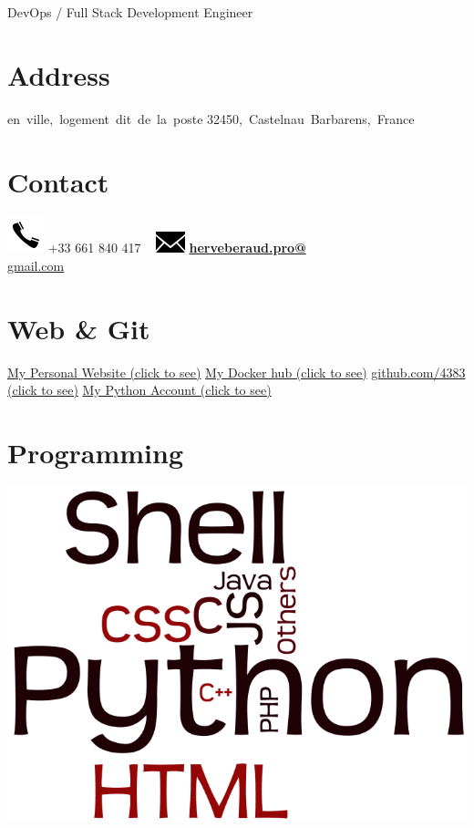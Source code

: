 \documentclass[]{friggeri-cv}
\begin{document}
    {DevOps / Full Stack Development Engineer}
      

\begin{aside}
  \section{Address}
    en~ville,~logement~dit~de~la~poste
    32450,~Castelnau~Barbarens,~France
    ~
  \section{Contact}
    \includegraphics[scale=0.50]{img/phone.png}
    +33 661 840 417
    ~
    \includegraphics[scale=0.50]{img/mail.png}
    \href{mailto:herveberaud.pro@gmail.com}{\textbf{herveberaud.pro@}\\gmail.com}
    ~
  \section{Web \& Git}
    \href{http://www.herve-beraud.ovh}{My Personal Website (click to see)}
	\href{https://hub.docker.com/r/4383}{My Docker hub (click to see)}
    \href{https://github.com/4383}{github.com/4383 (click to see)}
    \href{https://warehouse.python.org/user/4383/}{My Python Account (click to see)}
    ~
  \section{Programming}
    \includegraphics[scale=0.15]{img/programming.png}
    ~

\end{aside}
\end{document}
